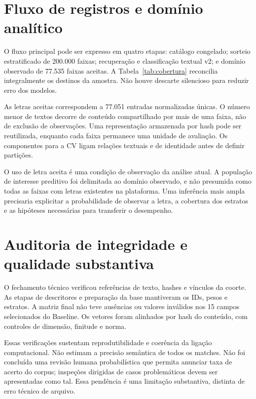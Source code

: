 \section{Fluxo de registros e domínio analítico}
O fluxo principal pode ser expresso em quatro etapas: catálogo congelado; sorteio estratificado de 200.000 faixas; recuperação e classificação textual v2; e domínio observado de 77.535 faixas aceitas. A Tabela~\ref{tab:cobertura} reconcilia integralmente os destinos da amostra. Não houve descarte silencioso para reduzir erro dos modelos.



As letras aceitas correspondem a 77.051 entradas normalizadas únicas. O número menor de textos decorre de conteúdo compartilhado por mais de uma faixa, não de exclusão de observações. Uma representação armazenada por hash pode ser reutilizada, enquanto cada faixa permanece uma unidade de avaliação. Os componentes para a CV ligam relações textuais e de identidade antes de definir partições.

O uso de letra aceita é uma condição de observação da análise atual. A população de interesse preditivo foi delimitada ao domínio observado, e não presumida como todas as faixas com letras existentes na plataforma. Uma inferência mais ampla precisaria explicitar a probabilidade de observar a letra, a cobertura dos estratos e as hipóteses necessárias para transferir o desempenho.

\section{Auditoria de integridade e qualidade substantiva}
O fechamento técnico verificou referências de texto, hashes e vínculos da coorte. As etapas de descritores e preparação da base mantiveram os IDs, pesos e estratos. A matriz final não teve ausências ou valores inválidos nos 15 campos selecionados do Baseline. Os vetores foram alinhados por hash do conteúdo, com controles de dimensão, finitude e norma.

Essas verificações sustentam reprodutibilidade e coerência da ligação computacional. Não estimam a precisão semântica de todos os matches. Não foi concluída uma revisão humana probabilística que permita anunciar taxa de acerto do corpus; inspeções dirigidas de casos problemáticos devem ser apresentadas como tal. Essa pendência é uma limitação substantiva, distinta de erro técnico de arquivo.
